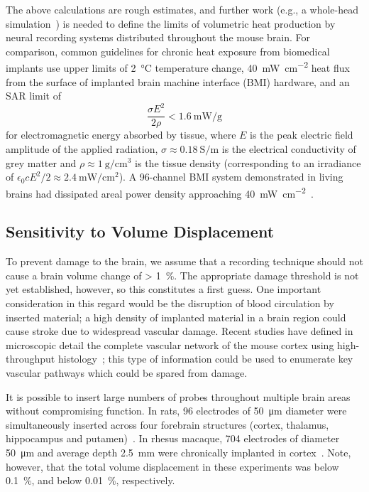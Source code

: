The above calculations are rough estimates, and further work (e.g., a whole-head simulation~\cite{Lazzi2005}) is needed to define the limits of volumetric heat production by neural recording systems distributed throughout the mouse brain. For comparison, common guidelines for chronic heat exposure from biomedical implants \cite{Wolf2008} use upper limits of \SI{2}{\celsius} temperature change, \SI{40}{\milli\watt\per\centi\meter\squared} heat flux from the surface of implanted brain machine interface (BMI) hardware, and an SAR limit of \[\frac{\sigma E^2}{2 \rho} < \SI{1.6}{\milli\watt\per\gram}\] for electromagnetic energy absorbed by tissue, where $E$ is the peak electric field amplitude of the applied radiation, $\sigma \approx \SI{0.18}{\siemens\per\meter}$ is the electrical conductivity of grey matter and $\rho \approx \SI{1}{\gram\per\centi\meter\cubed}$ is the tissue density \cite{Lazzi2005} (corresponding to an irradiance of $\epsilon_0 c E^2 / 2 \approx \SI{2.4}{\milli\watt\per\centi\meter\squared}$). A 96-channel BMI system demonstrated in living brains had dissipated areal power density approaching \SI{40}{\milli\watt\per\centi\meter\squared}~\cite{rizk2009}.

\subsection{Sensitivity to Volume Displacement}

To prevent damage to the brain, we assume that a recording technique should not cause a brain volume change of \SI{> 1}{\percent}. The appropriate damage threshold is not yet established, however, so this constitutes a first guess. One important consideration in this regard would be the disruption of blood circulation by inserted material; a high density of implanted material in a brain region could cause stroke due to widespread vascular damage. Recent studies have defined in microscopic detail the complete vascular network of the mouse cortex using high-throughput histology~\cite{Kleinfeld2013}; this type of information could be used to enumerate key vascular pathways which could be spared from damage.

It is possible to insert large numbers of probes throughout multiple brain areas without compromising function. In rats, 96 electrodes of \SI{50}{\micro\meter} diameter were simultaneously inserted across four forebrain structures (cortex, thalamus, hippocampus and putamen)~\cite{Ribeiro2004}. In rhesus macaque, 704 electrodes of diameter \SI{50}{\micro\meter} and average depth \SI{2.5}{\milli\meter} were chronically implanted in cortex~\cite{Nicolelis2003}. Note, however, that the total volume displacement in these experiments was below \SI{0.1}{\percent}, and below \SI{0.01}{\percent}, respectively. 

